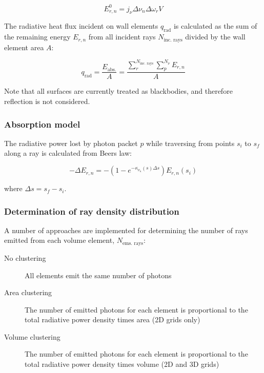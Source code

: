 \begin{equation}
 E_{r,n}^0 = j_{\nu} \Delta \nu_{n} \Delta \omega_{r} V
\end{equation}

The radiative heat flux incident on wall elements $q_\text{rad}$ is calculated as the sum of the remaining energy $E_{r,n}$ from all incident rays $N_\text{inc. rays}$ divided by the wall element area $A$:

\begin{equation}
 q_\text{rad} = \frac{ E_\text{abs.} }{A} =  \frac{ \displaystyle \sum_{r}^{N_{\text{inc. rays}}} \displaystyle \sum_{p}^{N_{\nu}} E_{r,n} }{ A }
 \label{eq:my_divq_DT_2}
\end{equation}

\noindent Note that all surfaces are currently treated as blackbodies, and therefore reflection is not considered.

\subsubsection{Absorption model}

The radiative power lost by photon packet $p$ while traversing from points $s_{i}$ to $s_{f}$ along a ray is calculated from Beers law:

\begin{equation}
 - \Delta E_{r,n} = - ( 1 - e^{-\kappa_{\nu_{n}}(s) \Delta s } ) E_{r,n}(s_{i})
 \label{eq:E_rn}
\end{equation}

\noindent where $\Delta s = s_{f} - s_{i}$.

\subsubsection{Determination of ray density distribution}
\label{sec:ray_density_distribution}

A number of approaches are implemented for determining the number of rays emitted from each volume element, $N_{\text{ems. rays}}$:

\begin{description}
 \item[No clustering] All elements emit the same number of photons
 \item[Area clustering] The number of emitted photons for each element is proportional to the total radiative power density times area (2D grids only)
 \item[Volume clustering] The number of emitted photons for each element is proportional to the total radiative power density times volume (2D and 3D grids)
\end{description}

